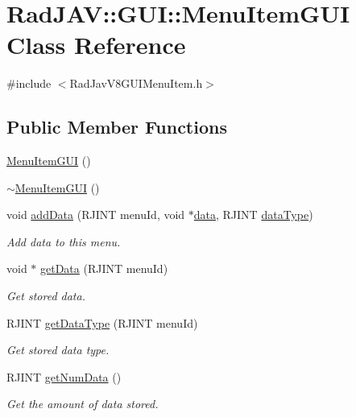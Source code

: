 \hypertarget{class_rad_j_a_v_1_1_g_u_i_1_1_menu_item_g_u_i}{}\section{Rad\+J\+AV\+:\+:G\+UI\+:\+:Menu\+Item\+G\+UI Class Reference}
\label{class_rad_j_a_v_1_1_g_u_i_1_1_menu_item_g_u_i}


{\ttfamily \#include $<$Rad\+Jav\+V8\+G\+U\+I\+Menu\+Item.\+h$>$}

\subsection*{Public Member Functions}
\begin{DoxyCompactItemize}
\item 
\mbox{\hyperlink{class_rad_j_a_v_1_1_g_u_i_1_1_menu_item_g_u_i_aa26bde44354ba8c7270cee1f2672ef94}{Menu\+Item\+G\+UI}} ()
\item 
\mbox{\hyperlink{class_rad_j_a_v_1_1_g_u_i_1_1_menu_item_g_u_i_ac0dcaf0bdd5b3a49bbab575ee0e4dd2c}{$\sim$\+Menu\+Item\+G\+UI}} ()
\item 
void \mbox{\hyperlink{class_rad_j_a_v_1_1_g_u_i_1_1_menu_item_g_u_i_a42f33c3cbc121be3234edba583c40e4b}{add\+Data}} (R\+J\+I\+NT menu\+Id, void $\ast$\mbox{\hyperlink{class_rad_j_a_v_1_1_g_u_i_1_1_menu_item_g_u_i_a3fc65dfe2978db7d8378bc79e451b17b}{data}}, R\+J\+I\+NT \mbox{\hyperlink{class_rad_j_a_v_1_1_g_u_i_1_1_menu_item_g_u_i_a90c6736fb544b4c757fd757c3e28c04a}{data\+Type}})
\begin{DoxyCompactList}\small\item\em Add data to this menu. \end{DoxyCompactList}\item 
void $\ast$ \mbox{\hyperlink{class_rad_j_a_v_1_1_g_u_i_1_1_menu_item_g_u_i_a758f1b4e9f0c602b62347dc004a46062}{get\+Data}} (R\+J\+I\+NT menu\+Id)
\begin{DoxyCompactList}\small\item\em Get stored data. \end{DoxyCompactList}\item 
R\+J\+I\+NT \mbox{\hyperlink{class_rad_j_a_v_1_1_g_u_i_1_1_menu_item_g_u_i_adb9a1c6239dad496d4b1ad9317b1691a}{get\+Data\+Type}} (R\+J\+I\+NT menu\+Id)
\begin{DoxyCompactList}\small\item\em Get stored data type. \end{DoxyCompactList}\item 
R\+J\+I\+NT \mbox{\hyperlink{class_rad_j_a_v_1_1_g_u_i_1_1_menu_item_g_u_i_a9f39ede1f0bf6e5404c4cd47a68f1217}{get\+Num\+Data}} ()
\begin{DoxyCompactList}\small\item\em Get the amount of data stored. \end{DoxyCompactList}\end{DoxyCompactItemize}
